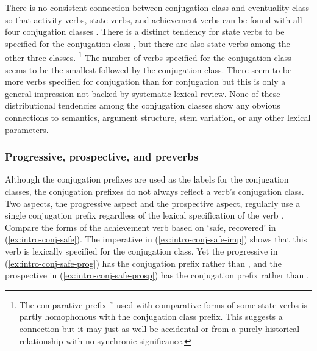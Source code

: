 \documentclass[12pt,letterpaper,oneside,article]{memoir}
\begin{document}
There is no consistent connection between conjugation class and eventuality class so that activity verbs, state verbs, and achievement verbs can be found with all four conjugation classes \parencite[614]{crippen:2019}.
There is a distinct tendency for state verbs to be specified for the  conjugation class \parencites[254]{leer:1991}[620]{crippen:2019}, but there are also state verbs among the other three classes.%
\footnote{The comparative prefix  \~\  used with comparative forms of some state verbs is partly homophonous with the  conjugation class prefix.
This suggests a connection but it may just as well be accidental or from a purely historical relationship with no synchronic significance.}
The number of verbs specified for the  conjugation class seems to be the smallest followed by the  conjugation class.
There seem to be more verbs specified for  conjugation than for  conjugation but this is only a general impression not backed by systematic lexical review.
None of these distributional tendencies among the conjugation classes show any obvious connections to semantics, argument structure, stem variation, or any other lexical parameters.

\subsubsection{Progressive, prospective, and preverbs}\label{sec:intro-conj-progprosp}

Although the conjugation prefixes are used as the labels for the conjugation classes, the conjugation prefixes do not always reflect a verb’s conjugation class.
Two aspects, the progressive aspect and the prospective aspect, regularly use a single conjugation prefix regardless of the lexical specification of the verb \parencite[628–633]{crippen:2019}.
Compare the forms of the achievement verb based on  ‘safe, recovered’ in (\ref{ex:intro-conj-safe}).
The imperative in (\ref{ex:intro-conj-safe-imp}) shows that this verb is lexically specified for the  conjugation class.
Yet the progressive in (\ref{ex:intro-conj-safe-prog}) has the  conjugation prefix rather than , and the prospective in (\ref{ex:intro-conj-safe-prosp}) has the  conjugation prefix rather than .
\end{document}

